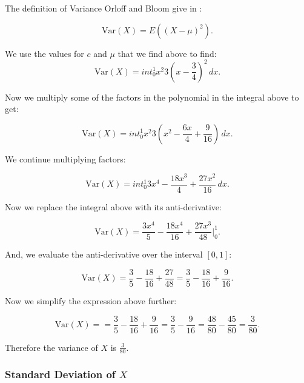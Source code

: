 \documentclass[a4paper,11pt]{article}
\begin{document}
The definition of Variance Orloff and Bloom give in \cite{reading6a}:

\begin{equation}
  \text{Var}\left(X \right) = E\left( \left( X-\mu\right)^2\right).
\end{equation}

We use the values for $c$ and $\mu$ that we find above to find:
\begin{equation}
  \text{Var}\left(X\right)=int_0^1 x^{2}3\left(x-\frac{3}{4}\right)^2 \,dx.
\end{equation}

Now we multiply some of the factors in the polynomial in the integral above
to get:

\begin{equation}
  \text{Var}\left(X\right)=int_0^1 x^{2}3\left(x^2-\frac{6x}{4}+\frac{9}{16}\right) \,dx.
\end{equation}


We continue multiplying factors:

\begin{equation}
  \text{Var}\left(X\right)=int_0^1 3x^4-\frac{18x^3}{4}+\frac{27x^2}{16} \,dx.
\end{equation}


Now we replace the integral above with its anti-derivative:

\begin{equation}
  \text{Var}\left(X\right)= \frac{3x^4}{5}-\frac{18x^4}{16}+\frac{27x^3}{48} \bigg\rvert_0^1.
\end{equation}

And, we evaluate the anti-derivative over  the interval $\left[0, 1\right]$:

\begin{equation}
  \text{Var}\left(X\right)= \frac{3}{5}-\frac{18}{16}+\frac{27}{48}=\frac{3}{5}-\frac{18}{16}+\frac{9}{16}.
\end{equation}

Now we simplify the expression above further:

\begin{equation}
  \text{Var}\left(X\right)= =\frac{3}{5}-\frac{18}{16}+\frac{9}{16}=\frac{3}{5}-\frac{9}{16}=\frac{48}{80}-\frac{45}{80}=\frac{3}{80}.
\end{equation}

Therefore the variance of $X$ is $\frac{3}{80}$.

\subsubsection{Standard Deviation of $X$}
\end{document}
